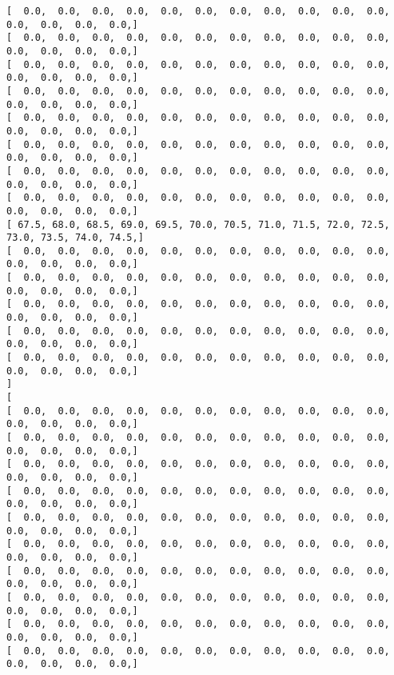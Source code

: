 \documentclass[11pt]{article}
\begin{document}
\begin{Verbatim}[commandchars=\\\{\}]
[   0.0,   0.0,   0.0,   0.0,   0.0,   0.0,   0.0,   0.0,   0.0,   0.0,   0.0,   0.0,   0.0,   0.0,   0.0, ]
[   0.0,   0.0,   0.0,   0.0,   0.0,   0.0,   0.0,   0.0,   0.0,   0.0,   0.0,   0.0,   0.0,   0.0,   0.0, ]
[   0.0,   0.0,   0.0,   0.0,   0.0,   0.0,   0.0,   0.0,   0.0,   0.0,   0.0,   0.0,   0.0,   0.0,   0.0, ]
[   0.0,   0.0,   0.0,   0.0,   0.0,   0.0,   0.0,   0.0,   0.0,   0.0,   0.0,   0.0,   0.0,   0.0,   0.0, ]
[   0.0,   0.0,   0.0,   0.0,   0.0,   0.0,   0.0,   0.0,   0.0,   0.0,   0.0,   0.0,   0.0,   0.0,   0.0, ]
[   0.0,   0.0,   0.0,   0.0,   0.0,   0.0,   0.0,   0.0,   0.0,   0.0,   0.0,   0.0,   0.0,   0.0,   0.0, ]
[   0.0,   0.0,   0.0,   0.0,   0.0,   0.0,   0.0,   0.0,   0.0,   0.0,   0.0,   0.0,   0.0,   0.0,   0.0, ]
[   0.0,   0.0,   0.0,   0.0,   0.0,   0.0,   0.0,   0.0,   0.0,   0.0,   0.0,   0.0,   0.0,   0.0,   0.0, ]
[  67.5,  68.0,  68.5,  69.0,  69.5,  70.0,  70.5,  71.0,  71.5,  72.0,  72.5,  73.0,  73.5,  74.0,  74.5, ]
[   0.0,   0.0,   0.0,   0.0,   0.0,   0.0,   0.0,   0.0,   0.0,   0.0,   0.0,   0.0,   0.0,   0.0,   0.0, ]
[   0.0,   0.0,   0.0,   0.0,   0.0,   0.0,   0.0,   0.0,   0.0,   0.0,   0.0,   0.0,   0.0,   0.0,   0.0, ]
[   0.0,   0.0,   0.0,   0.0,   0.0,   0.0,   0.0,   0.0,   0.0,   0.0,   0.0,   0.0,   0.0,   0.0,   0.0, ]
[   0.0,   0.0,   0.0,   0.0,   0.0,   0.0,   0.0,   0.0,   0.0,   0.0,   0.0,   0.0,   0.0,   0.0,   0.0, ]
[   0.0,   0.0,   0.0,   0.0,   0.0,   0.0,   0.0,   0.0,   0.0,   0.0,   0.0,   0.0,   0.0,   0.0,   0.0, ]
]
[
[   0.0,   0.0,   0.0,   0.0,   0.0,   0.0,   0.0,   0.0,   0.0,   0.0,   0.0,   0.0,   0.0,   0.0,   0.0, ]
[   0.0,   0.0,   0.0,   0.0,   0.0,   0.0,   0.0,   0.0,   0.0,   0.0,   0.0,   0.0,   0.0,   0.0,   0.0, ]
[   0.0,   0.0,   0.0,   0.0,   0.0,   0.0,   0.0,   0.0,   0.0,   0.0,   0.0,   0.0,   0.0,   0.0,   0.0, ]
[   0.0,   0.0,   0.0,   0.0,   0.0,   0.0,   0.0,   0.0,   0.0,   0.0,   0.0,   0.0,   0.0,   0.0,   0.0, ]
[   0.0,   0.0,   0.0,   0.0,   0.0,   0.0,   0.0,   0.0,   0.0,   0.0,   0.0,   0.0,   0.0,   0.0,   0.0, ]
[   0.0,   0.0,   0.0,   0.0,   0.0,   0.0,   0.0,   0.0,   0.0,   0.0,   0.0,   0.0,   0.0,   0.0,   0.0, ]
[   0.0,   0.0,   0.0,   0.0,   0.0,   0.0,   0.0,   0.0,   0.0,   0.0,   0.0,   0.0,   0.0,   0.0,   0.0, ]
[   0.0,   0.0,   0.0,   0.0,   0.0,   0.0,   0.0,   0.0,   0.0,   0.0,   0.0,   0.0,   0.0,   0.0,   0.0, ]
[   0.0,   0.0,   0.0,   0.0,   0.0,   0.0,   0.0,   0.0,   0.0,   0.0,   0.0,   0.0,   0.0,   0.0,   0.0, ]
[   0.0,   0.0,   0.0,   0.0,   0.0,   0.0,   0.0,   0.0,   0.0,   0.0,   0.0,   0.0,   0.0,   0.0,   0.0, ]

\end{Verbatim}
\end{document}
